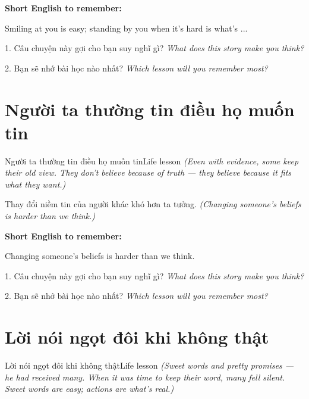 \begin{ghinhoanh}
\textbf{Short English to remember:}

Smiling at you is easy; standing by you when it's hard is what's ...

\end{ghinhoanh}

\begin{tuhocnhanh}
1. Câu chuyện này gợi cho bạn suy nghĩ gì? \textit{What does this story make you think?}

2. Bạn sẽ nhớ bài học nào nhất? \textit{Which lesson will you remember most?}
\end{tuhocnhanh}
\ngancach


\section{Người ta thường tin điều họ muốn tin}
\begin{truyen}{Người ta thường tin điều họ muốn tin}{Life lesson}
\textit{(Even with evidence, some keep their old view. They don't believe because of truth — they believe because it fits what they want.)}
\end{truyen}

\begin{baihoc}
Thay đổi niềm tin của người khác khó hơn ta tưởng.
\textit{(Changing someone's beliefs is harder than we think.)}
\end{baihoc}

\begin{ghinhoanh}
\textbf{Short English to remember:}

Changing someone's beliefs is harder than we think.

\end{ghinhoanh}

\begin{tuhocnhanh}
1. Câu chuyện này gợi cho bạn suy nghĩ gì? \textit{What does this story make you think?}

2. Bạn sẽ nhớ bài học nào nhất? \textit{Which lesson will you remember most?}
\end{tuhocnhanh}
\ngancach


\section{Lời nói ngọt đôi khi không thật}
\begin{truyen}{Lời nói ngọt đôi khi không thật}{Life lesson}
\textit{(Sweet words and pretty promises — he had received many. When it was time to keep their word, many fell silent. Sweet words are easy; actions are what's real.)}
\end{truyen}

